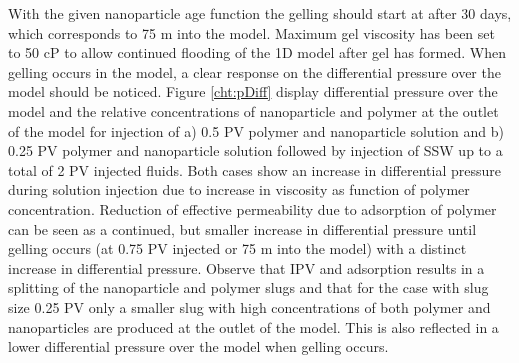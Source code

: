 With the given nanoparticle age function the gelling should start at after 30 days, which corresponds to 75 m into the model. Maximum gel viscosity has been set to 50 cP to allow continued flooding of the 1D model after gel has formed. When gelling occurs in the model, a clear response on the differential pressure over the model should be noticed. Figure \ref{cht:pDiff} display differential pressure over the model and the relative concentrations of nanoparticle and polymer at the outlet of the model for injection of a) 0.5 PV polymer and nanoparticle solution and b) 0.25 PV polymer and nanoparticle solution followed by injection of SSW up to a total of 2 PV injected fluids. Both cases show an increase in differential pressure during solution injection due to increase in viscosity as function of polymer concentration. Reduction of effective permeability due to adsorption of polymer can be seen as a continued, but smaller increase in differential pressure until gelling occurs (at 0.75 PV injected or 75 m into the model) with a distinct increase in differential pressure. Observe that IPV and adsorption results in a splitting of the nanoparticle and polymer slugs and that for the case with slug size 0.25 PV only a smaller slug with high concentrations of both polymer and nanoparticles are produced at the outlet of the model. This is also reflected in a lower differential pressure over the model when gelling occurs.  

